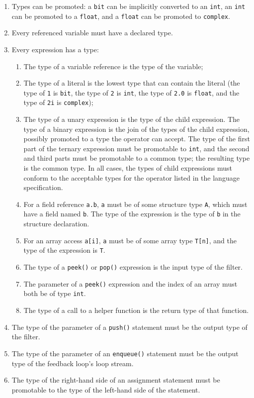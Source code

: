 \documentclass[11pt]{article}
\begin{document}
\begin{enumerate}
\item Types can be promoted: a \lstinline|bit| can be implicitly
  converted to an \lstinline|int|, an \lstinline|int| can be promoted
  to a \lstinline|float|, and a \lstinline|float| can be promoted to
  \lstinline|complex|.
\item Every referenced variable must have a declared type.
\item Every expression has a type:
\begin{enumerate}
\item The type of a variable reference is the type of the variable;
\item The type of a literal is the lowest type that can contain the
  literal (the type of \lstinline|1| is \lstinline|bit|, the type of
  \lstinline|2| is \lstinline|int|, the type of \lstinline|2.0| is
  \lstinline|float|, and the type of \lstinline|2i| is
  \lstinline|complex|);
\item The type of a unary expression is the type of the child
  expression.  The type of a binary expression is the join of the
  types of the child expression, possibly promoted to a type the
  operator can accept.  The type of the first part of the ternary
  expression must be promotable to \lstinline|int|, and the second and
  third parts must be promotable to a common type; the resulting type
  is the common type.  In all cases, the types of child expressions
  must conform to the acceptable types for the operator listed in the
  language specification.
\item For a field reference \lstinline|a.b|, \lstinline|a| must be of
  some structure type \lstinline|A|, which must have a field named
  \lstinline|b|.  The type of the expression is the type of
  \lstinline|b| in the structure declaration.
\item For an array access \lstinline|a[i]|, \lstinline|a| must be of
  some array type \lstinline|T[n]|, and the type of the expression is
  \lstinline|T|.
\item The type of a \lstinline|peek()| or \lstinline|pop()| expression
  is the input type of the filter.
\item The parameter of a \lstinline|peek()| expression and the index
  of an array must both be of type \lstinline|int|.
\item The type of a call to a helper function is the return type of
  that function.
\end{enumerate}
\item The type of the parameter of a \lstinline|push()| statement must
  be the output type of the filter.
\item The type of the parameter of an \lstinline|enqueue()| statement
  must be the output type of the feedback loop's loop stream.
\item The type of the right-hand side of an assignment statement must
  be promotable to the type of the left-hand side of the statement.
\end{enumerate}
\end{document}
